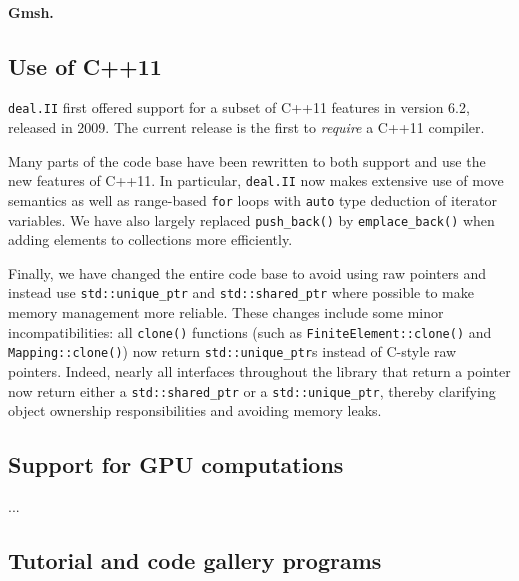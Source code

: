 \documentclass{ansarticle-preprint}
\newcommand{\specialword}[1]{\texttt{#1}}
\newcommand{\dealii}{{\specialword{deal.II}}}
\begin{document}
\paragraph*{Gmsh.}

  
\subsection{Use of C++11}
\dealii{} first offered support for a subset of C++11 features in
version 6.2, released in 2009. The current release is the first to
\emph{require} a C++11 compiler.

Many parts of the code base have been rewritten to both support and
use the new features of C++11. In particular, \dealii{} now makes
extensive use of move semantics as well as range-based \texttt{for}
loops with \texttt{auto} type deduction of iterator variables. We have
also largely replaced \texttt{push\_back()} by
\texttt{emplace\_back()} when adding elements to collections more
efficiently.

Finally, we have changed the entire code base to avoid using raw
pointers and instead use \texttt{std::unique\_ptr} and
\texttt{std::shared\_ptr} where possible to make memory management
more reliable. These changes include some minor incompatibilities: all
\texttt{clone()} functions (such as \texttt{FiniteElement::clone()} and
\texttt{Mapping::clone()}) now return \texttt{std::unique\_ptr}s instead of
C-style raw pointers. Indeed, nearly all interfaces throughout the library that return a pointer
now return either a \texttt{std::shared\_ptr} or a \texttt{std::unique\_ptr},
thereby clarifying object ownership responsibilities and avoiding memory leaks.


\subsection{Support for GPU computations}

...


\subsection{Tutorial and code gallery programs}
\end{document}
